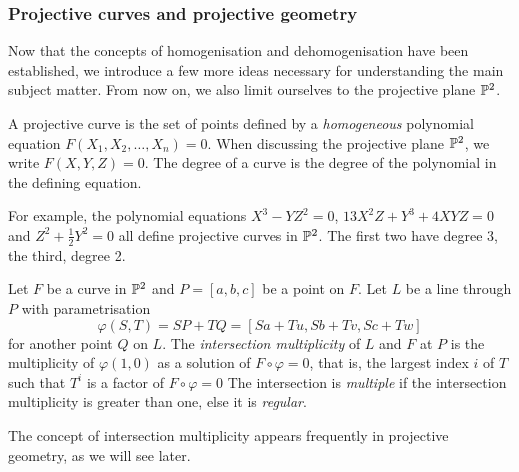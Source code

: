 \subsubsection{Projective curves and projective geometry}
Now that the concepts of homogenisation and dehomogenisation have been established, we introduce a few more ideas necessary for understanding the main subject matter.
From now on, we also limit ourselves to the projective plane $\pn[2]$.

\begin{definition}
	A projective curve is the set of points defined by a \emph{homogeneous} polynomial equation $F(X_1,X_2,\ldots,X_n) = 0$.
	When discussing the projective plane $\pn[2]$, we write $F(X,Y,Z) = 0$.
	The degree of a curve is the degree of the polynomial in the defining equation.
\end{definition}
For example, the polynomial equations $X^3-YZ^2=0$, $13X^2Z + Y^3 + 4XYZ = 0$ and $Z^2 + \frac{1}{2}Y^2 = 0$ all define projective curves in $\pn[2]$.
The first two have degree 3, the third, degree 2.

\begin{definition}
	Let $F$ be a curve in $\pn[2]$ and $P=[a,b,c]$ be a point on $F$.
	Let $L$ be a line through $P$ with parametrisation
	$$\varphi(S,T) = SP + TQ = [Sa+Tu,Sb+Tv,Sc+Tw]$$
	for another point $Q$ on $L$.
	The \emph{intersection multiplicity} of $L$ and $F$ at $P$ is the multiplicity of $\varphi(1,0)$ as a solution of $F \circ \varphi = 0$, that is, the largest index $i$ of $T$ such that $T^i$ is a factor of $F \circ \varphi = 0$
	The intersection is \emph{multiple} if the intersection multiplicity is greater than one, else it is \emph{regular}.
	\label{intersection-multiplicity}
\end{definition}
The concept of intersection multiplicity appears frequently in projective geometry, as we will see later.

